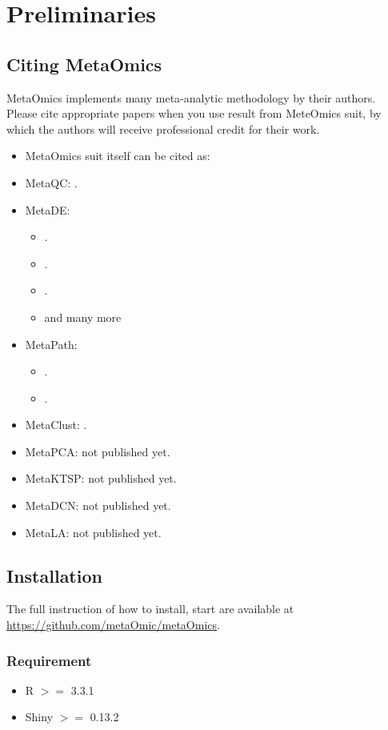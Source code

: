 \section{Preliminaries}
\subsection{Citing MetaOmics}
MetaOmics implements many meta-analytic methodology by their authors. 
Please cite appropriate papers when you use result from MeteOmics suit,
by which the authors will receive professional credit for their work.

\begin{itemize}
\item MetaOmics suit itself can be cited as:
\item MetaQC: .
\item MetaDE: 
\begin{itemize}
\item {}.
\item {}.
\item {}.
\item and many more
\end{itemize}
\item MetaPath: 
\begin{itemize}
\item {}.
\item {}.
\end{itemize}
\item MetaClust: .
\item MetaPCA: not published yet.
\item MetaKTSP: not published yet.
\item MetaDCN: not published yet.
\item MetaLA: not published yet.
\end{itemize}


\subsection{Installation}
The full instruction of how to install, start are available at \url{https://github.com/metaOmic/metaOmics}.
\subsubsection{Requirement}
\begin{itemize}
\item R $>=$ 3.3.1
\item Shiny $>=$ 0.13.2
\end{itemize}

